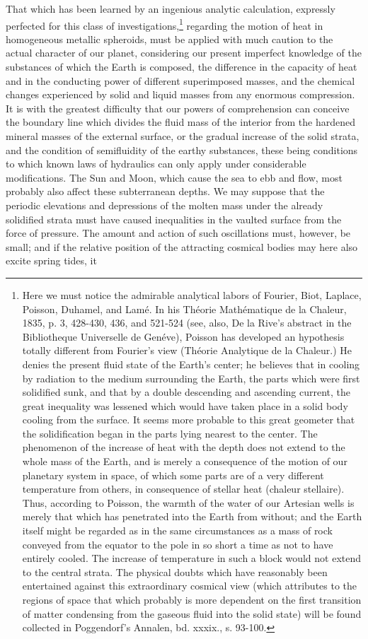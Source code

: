 That which has been learned by an ingenious analytic calculation, expressly perfected for this class of investigations,\footnote{Here we must notice the admirable analytical labors of Fourier, Biot, Laplace, Poisson, Duhamel, and Lam\'{e}. In his Th\'{e}orie Math\'{e}matique de la Chaleur, 1835, p. 3, 428-430, 436, and 521-524 (see, also, De la Rive's abstract in the Bibliotheque Universelle de Gen\'{e}ve), Poisson has developed an hypothesis totally different from Fourier's view (Th\'{e}orie Analytique de la Chaleur.) He denies the present fluid state of the Earth's center; he believes that in cooling by radiation to the medium surrounding the Earth, the parts which were first solidified sunk, and that by a double descending and ascending current, the great inequality was lessened which would have taken place in a solid body cooling from the surface. It seems more probable to this great geometer that the solidification began in the parts lying nearest to the center. The phenomenon of the increase of heat with the depth does not extend to the whole mass of the Earth, and is merely a consequence of the motion of our planetary system in space, of which some parts are of a very different temperature from others, in consequence of stellar heat (chaleur stellaire). Thus, according to Poisson, the warmth of the water of our Artesian wells is merely that which has penetrated into the Earth from without; and the Earth itself might be regarded as in the same circumstances as a mass of rock conveyed from the equator to the pole in so short a time as not to have entirely cooled. The increase of temperature in such a block would not extend to the central strata. The physical doubts which have reasonably been entertained against this extraordinary cosmical view (which attributes to the regions of space that which probably is more dependent on the first transition of matter condensing from the gaseous fluid into the solid state) will be found collected in Poggendorf's Annalen, bd. xxxix., s. 93-100.} regarding the motion of heat in homogeneous metallic spheroids, must be applied with much caution to the actual character of our planet, considering our present imperfect knowledge of the substances of which the Earth is composed, the difference in the capacity of heat and in the conducting power of different superimposed masses, and the chemical changes experienced by solid and liquid masses from any enormous compression. It is with the greatest difficulty that our powers of comprehension can conceive the boundary line which divides the fluid mass of the interior from the hardened mineral masses of the external surface, or the gradual increase of the solid strata, and the condition of semifluidity of the earthy substances, these being conditions to which known laws of hydraulics can only apply under considerable modifications. The Sun and Moon, which cause the sea to ebb and flow, most probably also affect these subterranean depths. We may suppose that the periodic elevations and depressions of the molten mass under the already solidified strata must have caused inequalities in the vaulted surface from the force of pressure. The amount and action of such oscillations must, however, be small; and if the relative position of the attracting cosmical bodies may here also excite spring tides, it 